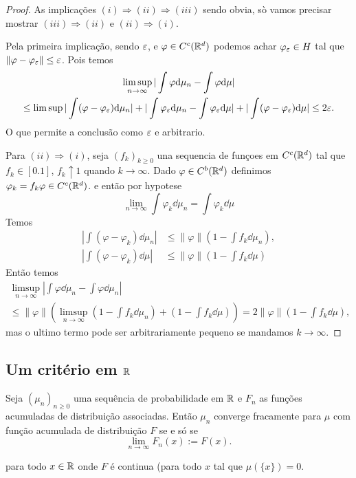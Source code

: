 \begin{proof}
 As implicações  $(i)\Rightarrow (ii) \Rightarrow (iii)$ sendo obvia, sò vamos precisar mostrar $(iii)\Rightarrow (ii)$ e $(ii)\Rightarrow (i)$.

Pela primeira implicação, sendo $\varepsilon$, e $\varphi \in C^c({\mathbb R}^d)$ podemos achar $\varphi_{\varepsilon}\in H$ tal que $\|\varphi-\varphi_{\varepsilon} \|\le \varepsilon$.
 Pois temos
 \begin{multline}
  \limsup_{n\to \infty} |\int \varphi \mathrm{d} \mu_n-\int \varphi \mathrm{d} \mu|\\
  \le \limsup |\int (\varphi-\varphi_{\varepsilon}) \mathrm{d} \mu_n|+|\int \varphi_{\varepsilon} \mathrm{d} \mu_n-\int \varphi_{\varepsilon}\mathrm{d} \mu|
  + |\int (\varphi-\varphi_{\varepsilon})\mathrm{d} \mu|\le
  2\varepsilon.
 \end{multline}
O que permite a conclusão como $\varepsilon$ e arbitrario.

\medskip

Para $(ii)\Rightarrow (i)$, seja $(f_k)_{k\ge 0}$ una sequencia de funçoes em $C^c({\mathbb R}^d)$ tal que
$f_k\in [0.1]$, $f_k \uparrow 1$ quando $k \to \infty$. Dado $\varphi \in C^b({\mathbb R}^d)$ definimos $\varphi_k=f_k\varphi \in C^c({\mathbb R}^d)$.
e então por hypotese
$$\lim_{n\to \infty} \int \varphi_k \dd \mu_n= \int \varphi_k \dd \mu  $$
Temos
\begin{equation}
 \begin{split}
 \left |\int (\varphi-\varphi_k) \dd \mu_n \right| & \le  \| \varphi \| \left(1- \int f_k \dd \mu_n \right),\\
    \left|\int (\varphi-\varphi_k) \dd \mu\right| & \le  \| \varphi \| \left(1- \int f_k \dd \mu \right)
 \end{split}
\end{equation}
Então temos
\begin{multline}
 \limsup_{n\to \infty} \left|\int \varphi\dd \mu_n-\int \varphi\dd \mu_n\right|\\
 \le   \| \varphi \| \left( \limsup_{n\to \infty} \left(1- \int f_k \dd \mu_n \right)
 + \left(1- \int f_k \dd \mu \right) \right) = 2 \| \varphi \| \left(1- \int f_k \dd \mu \right),
\end{multline}
mas o ultimo termo pode ser arbitrariamente pequeno se mandamos $k\to \infty$.
\end{proof}

\subsection{Um critério em ${\mathbb R}$}

\begin{proposition}\label{prop:dafuncao}
Seja $(\mu_n)_{n\ge 0}$ uma sequência de probabilidade em ${\mathbb R}$ e $F_n$ as funções acumuladas de distribuição associadas.
Então $\mu_n$ converge fracamente para $\mu$ com  função acumulada de distribuição $F$ se e só se
\begin{equation}\label{eq:acumulex}
 \lim_{n\to \infty} F_n(x):= F(x).
\end{equation}

para todo $x\in {\ensuremath{\mathbb R}}$ onde $F$ é continua (para todo $x$ tal que $\mu(\{x\})=0$.
\end{proposition}


